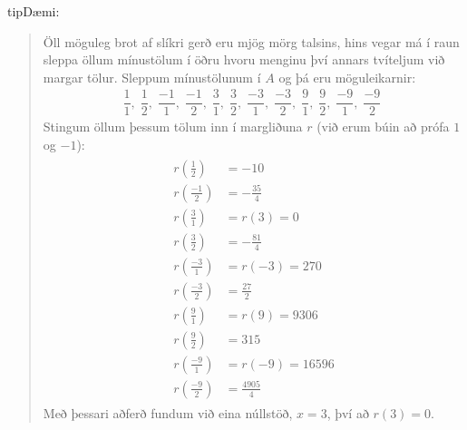 \documentclass[a4paper,10pt,icelandic]{sphinxmanual}
\begin{document}
\begin{sphinxadmonition}{tip}{Dæmi:}
\begin{quote}
Öll möguleg brot af slíkri gerð eru mjög mörg talsins, hins vegar má í raun sleppa öllum mínustölum í öðru hvoru menginu því annars tvíteljum við margar tölur. Sleppum mínustölunum í \(A\) og þá eru möguleikarnir:
\begin{equation*}
\begin{split}\dfrac{1}{1}, \;
\dfrac{1}{2}, \;
\dfrac{-1}{1}, \;
\dfrac{-1}{2}, \;
\dfrac{3}{1},\;
\dfrac{3}{2}, \;
\dfrac{-3}{1}, \;
\dfrac{-3}{2}, \;
\dfrac{9}{1}, \;
\dfrac{9}{2}, \;
\dfrac{-9}{1},\;
\dfrac{-9}{2}\;\end{split}
\end{equation*}
Stingum öllum þessum tölum inn í margliðuna \(r\) (við erum búin að prófa \(1\) og \(-1\)):
\begin{equation*}
\begin{split}\begin{aligned}
        r\left(\frac{1}{2}\right)& =-10 \\
        r\left(\frac{-1}{2}\right)&=-\frac{35}{4}\\
        r\left(\frac{3}{1}\right)&=r(3)=0\\
        r\left(\frac{3}{2}\right)&=-\frac{81}{4}\\
        r\left(\frac{-3}{1}\right)&=r(-3)=270\\
        r\left(\frac{-3}{2}\right)&=\frac{27}{2}\\
        r\left(\frac{9}{1}\right)&=r(9)=9306\\
        r\left(\frac{9}{2}\right)&=315\\
        r\left(\frac{-9}{1}\right)&=r(-9)=16596\\
        r\left(\frac{-9}{2}\right)&=\frac{4905}{4}
\end{aligned}\end{split}
\end{equation*}
Með þessari aðferð fundum við eina núllstöð, \(x=3\), því að \(r(3)=0\).
\end{quote}
\end{sphinxadmonition}
\end{document}
